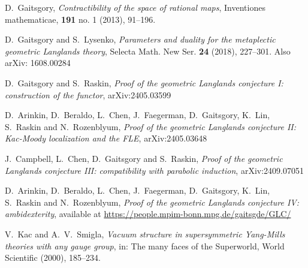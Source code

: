 \documentclass[9pt]{amsart}
\theoremstyle{remark}
\theoremstyle{definition}
\theoremstyle{remark}
\numberwithin{equation}{section}
\begin{document}
\begin{thebibliography}{99}
 D.~Gaitsgory, {\it Contractibility of the space of rational maps}, 
Inventiones mathematicae, {\bf 191} no. 1 (2013), 91--196.

%
 D.~Gaitsgory and S.~Lysenko, {\it Parameters and duality for the metaplectic geometric Langlands theory}, 
Selecta Math. New Ser. {\bf 24} (2018), 227--301. Also arXiv: 1608.00284
%

 D.~Gaitsgory and S.~Raskin, {\it Proof of the geometric Langlands conjecture I: construction of the functor},
arXiv:2405.03599

 D.~Arinkin, D.~Beraldo, L.~Chen, J.~Faegerman, D.~Gaitsgory, K.~Lin, S.~Raskin and N.~Rozenblyum, \newline
{\it Proof of the geometric Langlands conjecture II: Kac-Moody localization and the FLE}, 
arXiv:2405.03648

 J.~Campbell, L.~Chen, D.~Gaitsgory and S.~Raskin, 
{\it Proof of the geometric Langlands conjecture III: \newline compatibility with parabolic induction},
arXiv:2409.07051

 D.~Arinkin, D.~Beraldo, L.~Chen, J.~Faegerman, D.~Gaitsgory, K.~Lin, S.~Raskin and N.~Rozenblyum, \newline
{\it Proof of the geometric Langlands conjecture IV: ambidexterity}, \newline
available at \url{https://people.mpim-bonn.mpg.de/gaitsgde/GLC/}


 V.~Kac and A.~V.~Smigla,  {\it Vacuum structure in supersymmetric Yang-Mills theories with any gauge group},
in: The many faces of the Superworld, World Scientific (2000), 185--234. 



\end{thebibliography}
\end{document}
